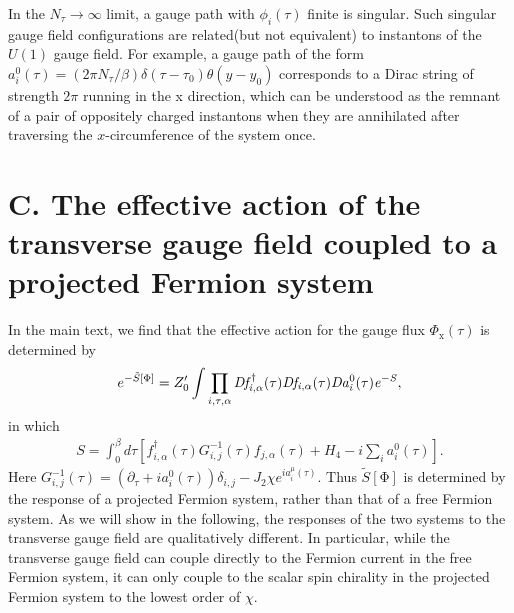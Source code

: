 \documentclass[12pt]{article}
\begin{document}
In the $N_{\tau}\to \infty$ limit, a gauge path with $\phi_{i}(\tau)$ finite is singular. Such singular gauge field configurations are related(but not equivalent) to instantons of the $U(1)$ gauge field. For example, a gauge path of the form $a^{0}_{i}(\tau)=(2\pi N_{\tau}/\beta) \delta(\tau-\tau_{0}) \theta(y-y_{0})$ corresponds to a Dirac string of strength $2\pi$ running in the x direction, which can be understood as the remnant of a pair of oppositely charged instantons when they are annihilated after traversing the $x$-circumference of the system once. 


\section*{C. The effective action of the transverse gauge field coupled to a projected Fermion system}
In the main text, we find that the effective action for the gauge flux $\Phi_{\mathrm{x}}(\tau)$ is determined by 
 \begin{eqnarray}
e^{-\tilde{S}[\Phi]}= Z'_{0} \int \prod_{i,\tau,\alpha} \it{D}f^{\dagger}_{i,\alpha}(\tau)\it{D}f_{i,\alpha}(\tau)\it{D}a^{\mathrm{0}}_{i}(\tau)e^{-S},\nonumber
\end{eqnarray}
in which
 \begin{eqnarray}
S=\int_{0}^{\beta} d\tau   [f^{\dagger}_{i,\alpha}(\tau)G^{-1}_{i,j}(\tau) f_{j,\alpha}(\tau)+H_{4}-i\sum_{i}a^{\mathrm{0}}_{i}(\tau)]. \nonumber
 \end{eqnarray} 
Here $G^{-1}_{i,j}(\tau)=(\partial_{\tau}+ia^{0}_{i}(\tau))\delta_{i,j}-J_{2}\chi e^{ia^{\mu}_{i}(\tau)}$.
Thus $\tilde{S}[\mathrm{\Phi}]$ is determined by the response of a projected Fermion system, rather than that of a free Fermion system. As we will show in the following, the responses of the two systems to the transverse gauge field are qualitatively different. In particular, while the transverse gauge field can couple directly to the Fermion current in the free Fermion system, it can only couple to the scalar spin chirality in the projected Fermion system to the lowest order of $\chi$. 
\end{document}
